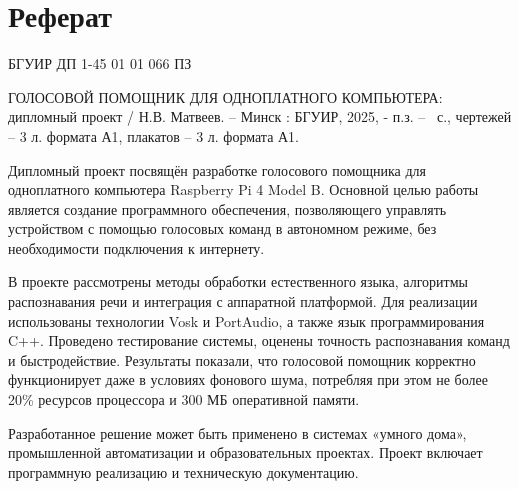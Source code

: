 \section*{Реферат}
\thispagestyle{empty} %

\noindent БГУИР ДП 1-45 01 01 066 ПЗ
\newline


\nohyphens{ГОЛОСОВОЙ ПОМОЩНИК ДЛЯ ОДНОПЛАТНОГО КОМПЬЮТЕРА}: дипломный проект / Н.В. Матвеев. – Минск : БГУИР, 2025, - п.з. – \pageref{LastPage}~с., чертежей – 3 л. формата А1, плакатов – 3 л. формата А1.

Дипломный проект посвящён разработке голосового помощника для одноплатного компьютера Raspberry Pi 4 Model B. Основной целью работы является создание программного обеспечения, позволяющего управлять устройством с помощью голосовых команд в автономном режиме, без необходимости подключения к интернету.

В проекте рассмотрены методы обработки естественного языка, алгоритмы распознавания речи и интеграция с аппаратной платформой. Для реализации использованы технологии Vosk и PortAudio, а также язык программирования C++. Проведено тестирование системы, оценены точность распознавания команд и быстродействие. Результаты показали, что голосовой помощник корректно функционирует даже в условиях фонового шума, потребляя при этом не более 20\% ресурсов процессора и 300 МБ оперативной памяти.

Разработанное решение может быть применено в системах «умного дома», промышленной автоматизации и образовательных проектах. Проект включает программную реализацию и техническую документацию.

\clearpage
